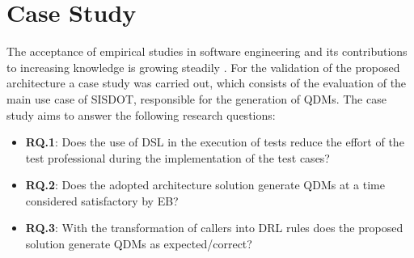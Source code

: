 \section{Case Study}
\label{sec:case_study} 


The acceptance of empirical studies in software engineering and its contributions to increasing knowledge is growing steadily \cite{runeson2009}. For the validation of the proposed architecture a case study was carried out, which consists of the evaluation of the main use case of SISDOT, responsible for the generation of QDMs. The case study aims to answer the following research questions:

\begin{itemize}

\item \textbf{RQ.1}: Does the use of DSL in the execution of tests reduce the effort of the test professional during the implementation of the test cases?

\item \textbf{RQ.2}: Does the adopted architecture solution generate QDMs at a time considered satisfactory by EB?


\item \textbf{RQ.3}: With the transformation of callers into DRL rules does the proposed solution generate QDMs as expected/correct?

\end{itemize}

